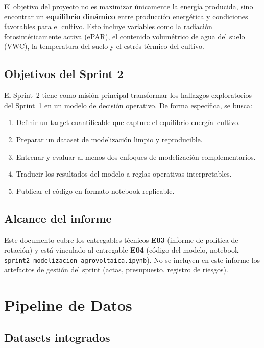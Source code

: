 \documentclass[12pt,a4paper]{article}
\begin{document}
El objetivo del proyecto no es maximizar únicamente la energía producida, sino encontrar
un \textbf{equilibrio dinámico} entre producción energética y condiciones favorables para
el cultivo. Esto incluye variables como la radiación fotosintéticamente activa (ePAR),
el contenido volumétrico de agua del suelo (VWC), la temperatura del suelo y el estrés
térmico del cultivo.

\subsection{Objetivos del Sprint 2}

El Sprint~2 tiene como misión principal transformar los hallazgos exploratorios del
Sprint~1 en un modelo de decisión operativo. De forma específica, se busca:

\begin{enumerate}[noitemsep]
    \item Definir un target cuantificable que capture el equilibrio energía--cultivo.
    \item Preparar un dataset de modelización limpio y reproducible.
    \item Entrenar y evaluar al menos dos enfoques de modelización complementarios.
    \item Traducir los resultados del modelo a reglas operativas interpretables.
    \item Publicar el código en formato notebook replicable.
\end{enumerate}

\subsection{Alcance del informe}

Este documento cubre los entregables técnicos \textbf{E03} (informe de política de
rotación) y está vinculado al entregable \textbf{E04} (código del modelo, notebook
\texttt{sprint2\_modelizacion\_agrovoltaica.ipynb}). No se incluyen en este informe los
artefactos de gestión del sprint (actas, presupuesto, registro de riesgos).

\newpage
\section{Pipeline de Datos}

\subsection{Datasets integrados}
\end{document}
